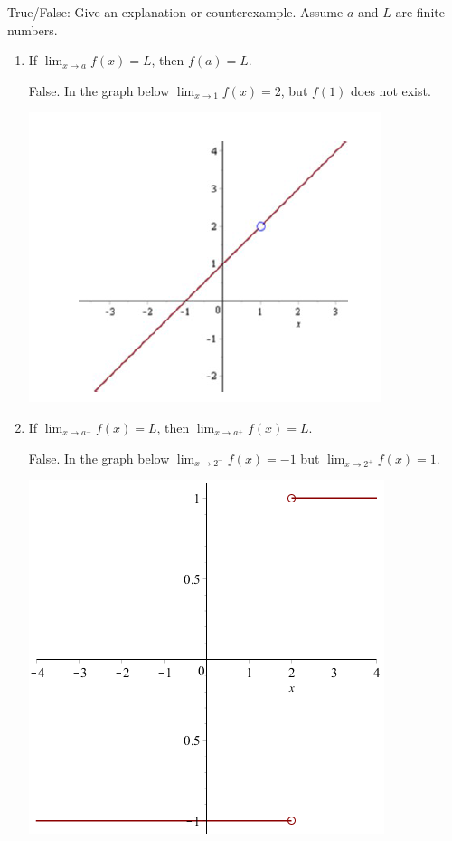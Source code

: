 \documentclass[nooutcomes,handout]{ximera}
\begin{document}
\begin{problem}
True/False:  Give an explanation or counterexample.  Assume $a$ and $L$ are finite numbers.
	
			\begin{enumerate}

			\item  If $ \lim_{x \to a} f(x) = L$, then $f(a) = L$.
			\begin{freeResponse}
			False.  In the graph below $ \lim_{x \to 1} f(x) = 2 $, but $f(1)$ does not exist.
				\begin{image}
				      \includegraphics{Figure1}
				\end{image}
			\end{freeResponse}
			
			\item  If $  \lim_{x \to a^-} f(x) = L$, then $  \lim_{x \to a^+} f(x) = L $.
			\begin{freeResponse}
			False.  In the graph below $ \lim_{x \to 2^-} f(x) = -1$ but $ \lim_{x \to 2^+} f(x) = 1$.
			
				\begin{image}
						      \includegraphics[scale=.7]{Figure2}		
				\end{image}
			\end{freeResponse}
			

\end{enumerate}
\end{problem}
\end{document}
